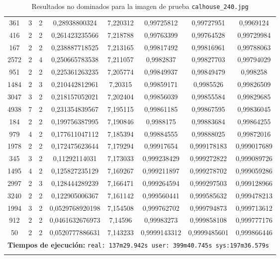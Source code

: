\begin{longtable}{|c|c|c|c|c|c|c|c|}
361 & 3 & 2 & 0,28938800324 & 7,220312 & 0,99725812 & 0,99727951 & 0,9969124 \\
416 & 2 & 2 & 0,261423235566 & 7,218788 & 0,99763399 & 0,99764528 & 0,99729984 \\
167 & 2 & 2 & 0,238887718525 & 7,213165 & 0,99817492 & 0,99816961 & 0,99788063 \\
2572 & 2 & 4 & 0,250665783538 & 7,211057 & 0,9982837 & 0,99827703 & 0,99794029 \\
951 & 2 & 2 & 0,225361263235 & 7,205774 & 0,99849937 & 0,99849479 & 0,998258 \\
1484 & 2 & 3 & 0,210442812961 & 7,20315 & 0,99859171 & 0,9985526 & 0,99826509 \\
3047 & 3 & 2 & 0,218157052021 & 7,202404 & 0,99856039 & 0,99855584 & 0,99829685 \\
4938 & 7 & 2 & 0,231354839567 & 7,195115 & 0,99861185 & 0,99867595 & 0,99836045 \\
184 & 2 & 2 & 0,199756387995 & 7,190846 & 0,9988175 & 0,99883684 & 0,99864255 \\
979 & 4 & 2 & 0,177611047112 & 7,185394 & 0,99884555 & 0,99888025 & 0,99872016 \\
1978 & 2 & 2 & 0,172475623644 & 7,179294 & 0,99917654 & 0,999178183 & 0,999017689 \\
345 & 3 & 2 & 0,11292114031 & 7,173033 & 0,999238429 & 0,999272822 & 0,999089726 \\
1495 & 4 & 2 & 0,125827235129 & 7,169267 & 0,999211897 & 0,999278702 & 0,999059286 \\
2997 & 2 & 3 & 0,128444289239 & 7,166471 & 0,999264594 & 0,999297503 & 0,999128966 \\
3240 & 2 & 2 & 0,122905006367 & 7,161142 & 0,999560441 & 0,999585632 & 0,999478213 \\
1994 & 3 & 2 & 0,0529768920198 & 7,154508 & 0,999762702 & 0,999794873 & 0,999713612 \\
912 & 2 & 2 & 0,0461632676973 & 7,14596 & 0,99983273 & 0,999858108 & 0,999777176 \\
50 & 2 & 2 & 0,0520777886631 & 7,143233 & 0,9999143312 & 0,9999485601 & 0,999866446 \\
\multicolumn{8}{|c|}{\textbf{Tiempos de ejecución:} \texttt{real: 137m29.942s user: 399m40.745s sys:197m36.579s
}}\\ \hline
\caption{Resultados no dominados para la imagen de prueba \texttt{calhouse\_240.jpg}}
\label{tab:calhouse_240}
\end{longtable}
\normalsize

